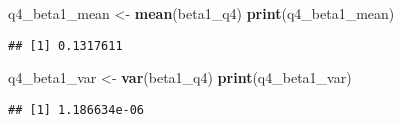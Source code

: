 \documentclass[
]{article}
\newenvironment{Shaded}{\begin{snugshade}}{\end{snugshade}}
\newcommand{\KeywordTok}[1]{\textcolor[rgb]{0.13,0.29,0.53}{\textbf{#1}}}
\newcommand{\NormalTok}[1]{#1}
\newcommand{\StringTok}[1]{\textcolor[rgb]{0.31,0.60,0.02}{#1}}
\begin{document}
\begin{Shaded}
\begin{Highlighting}[]
\NormalTok{q4_beta1_mean <-}\StringTok{ }\KeywordTok{mean}\NormalTok{(beta1_q4)}
\KeywordTok{print}\NormalTok{(q4_beta1_mean)}
\end{Highlighting}
\end{Shaded}

\begin{verbatim}
## [1] 0.1317611
\end{verbatim}

\begin{Shaded}
\begin{Highlighting}[]
\NormalTok{q4_beta1_var <-}\StringTok{ }\KeywordTok{var}\NormalTok{(beta1_q4)}
\KeywordTok{print}\NormalTok{(q4_beta1_var)}
\end{Highlighting}
\end{Shaded}

\begin{verbatim}
## [1] 1.186634e-06
\end{verbatim}
\end{document}
